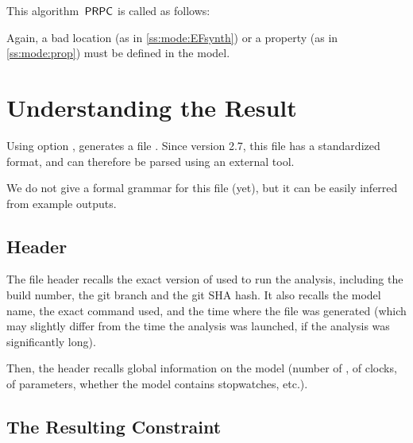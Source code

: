 This algorithm~$\mathsf{PRPC}$ is called as follows:


Again, a bad location (as in \cref{ss:mode:EFsynth}) or a property (as in \cref{ss:mode:prop}) must be defined in the model.





\chapter{Understanding the \imitator{} Result}\label{chapter:result}

Using option , \imitator{} generates a file .
Since version 2.7, this file has a standardized format, and can therefore be parsed using an external tool.

We do not give a formal grammar for this file (yet), but it can be easily inferred from example outputs.


\section{Header}

The file header recalls the exact version of \imitator{} used to run the analysis, including the build number, the git branch and the git SHA hash.
It also recalls the model name, the exact command used, and the time where the file was generated (which may slightly differ from the time the analysis was launched, if the analysis was significantly long).

Then, the header recalls global information on the model (number of \IPTA{}, of clocks, of parameters, whether the model contains stopwatches, etc.).


\section{The Resulting Constraint}


